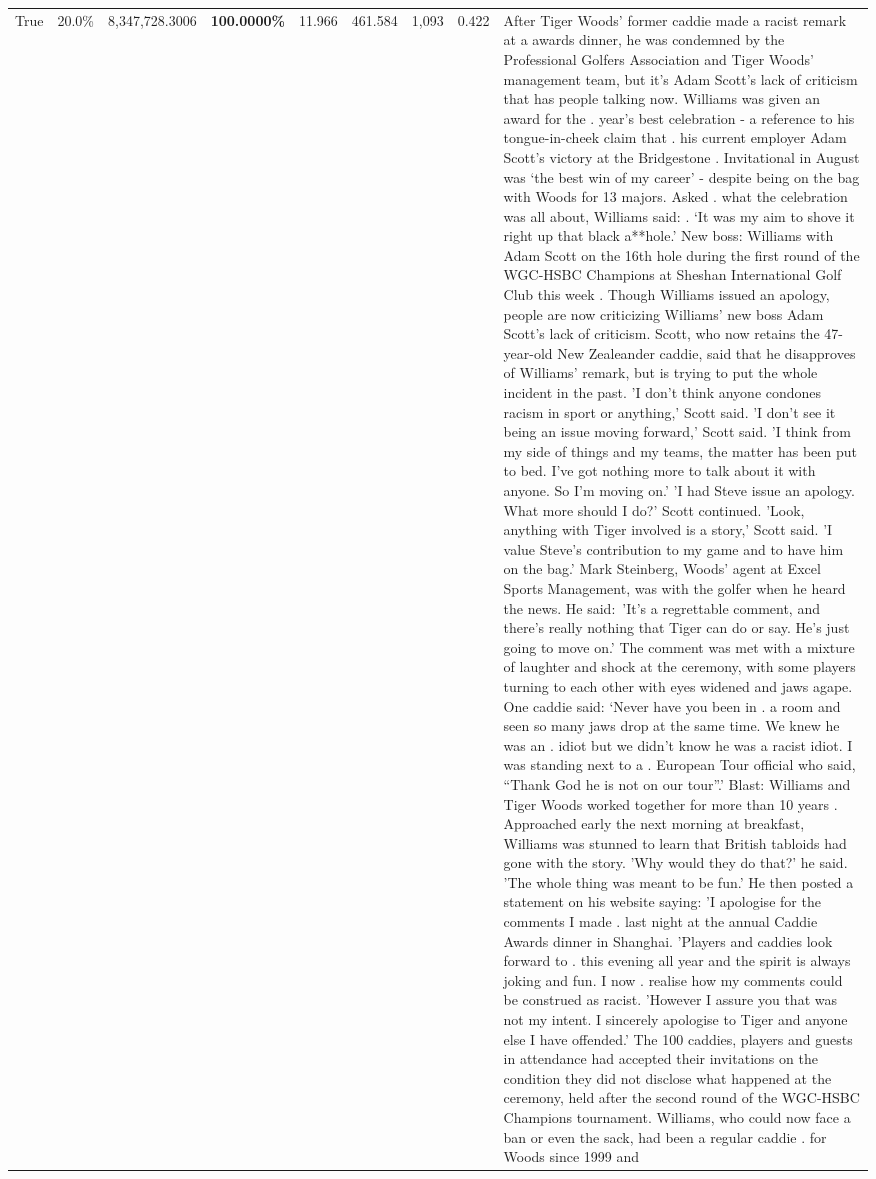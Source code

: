 \begin{table}[H]
\begin{tabular}{lllrlllll}
True & 20.0\% & 8,347,728.3006 & \bfseries \color{red} 100.0000\% & 11.966 & 461.584 & 1,093 & 0.422 & After Tiger Woods' former caddie made a racist remark at a awards dinner, he was condemned by the Professional Golfers Association and Tiger Woods' management team, but it's Adam Scott's lack of criticism that has people talking now. Williams was given an award for the . year’s best celebration - a reference to his tongue-in-cheek claim that . his current employer Adam Scott’s victory at the Bridgestone . Invitational in August was ‘the best win of my career’ - despite being on the bag with Woods for 13 majors. Asked . what the celebration was all about, Williams said: . ‘It was my aim to shove it right up that black a**hole.’ New boss: Williams with Adam Scott  on the 16th hole during the first round of the WGC-HSBC Champions at Sheshan International Golf Club this week . Though Williams issued an apology, people are now criticizing Williams' new boss Adam Scott's lack of criticism. Scott, who now retains the 47-year-old New Zealeander caddie, said that he disapproves of Williams' remark, but is trying to put the whole incident in the past. 'I don't think anyone condones racism in sport or anything,' Scott said. 'I don't see it being an issue moving forward,' Scott said. 'I think from my side of things and my teams, the matter has been put to bed. I've got nothing more to talk about it with anyone. So I'm moving on.' 'I had Steve issue an apology. What more should I do?' Scott continued. 'Look, anything with Tiger involved is a story,' Scott said. 'I value Steve's contribution to my game and to have him on the bag.' Mark Steinberg, Woods' agent at Excel Sports Management, was with the golfer when he heard the news. He said: 'It's a regrettable comment, and there's really nothing that Tiger can do or say. He's just going to move on.' The comment was met with a mixture of laughter and shock at the ceremony, with some players turning to each other with eyes widened and jaws agape. One caddie said: ‘Never have you been in . a room and seen so many jaws drop at the same time. We knew he was an . idiot but we didn’t know he was a racist idiot. I was standing next to a . European Tour official who said, “Thank God he is not on our tour”.’ Blast: Williams and Tiger Woods worked together for more than 10 years . Approached early the next morning at breakfast, Williams was stunned to learn that British tabloids had gone with the story. 'Why would they do that?' he said. 'The whole thing was meant to be fun.' He then posted a statement on his website saying: 'I apologise for the comments I made . last night at the annual Caddie Awards dinner in Shanghai. 'Players and caddies look forward to . this evening all year and the spirit is always joking and fun. I now . realise how my comments could be construed as racist. 'However I assure you that was not my intent. I sincerely apologise to Tiger and anyone else I have offended.' The 100 caddies, players and guests in attendance had accepted their invitations on the condition they did not disclose what happened at the ceremony, held after the second round of the WGC-HSBC Champions tournament. Williams, who could now face a ban or even the sack, had been a regular caddie . for Woods since 1999 and 
\end{tabular}
\end{table}
